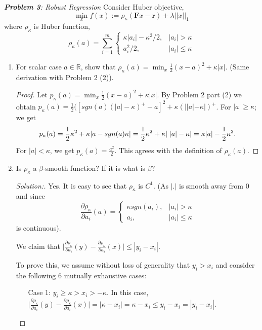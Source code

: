 \documentclass[a4paper,11pt,reqno]{amsart}
\theoremstyle{plain}
\theoremstyle{definition}
\theoremstyle{remark}
\numberwithin{equation}{section}
\begin{document}
\vskip 16pt \noindent
{\it \textbf{Problem 3}: Robust Regression}
\vskip 8pt
Consider Huber objective,
\[
\min_x f(x):=\rho_\kappa(\mathbf{F}x - \mathbf{r}) + \lambda||x||_1
\]
where $\rho_\kappa$ is Huber function,
\[
\rho_\kappa(a) = \sum_{i=1}^m\begin{cases}
\kappa|a_i| - \kappa^2/2,&|a_i| > \kappa\\
a_i^2/2,&|a_i| \le \kappa
\end{cases}
\]
\begin{enumerate}
\item For scalar case $a\in\mathbb{R}$, show that $\rho_\kappa(a) = \min_x \frac{1}{2}(x-a)^2+\kappa|x|$. (Same derivation with Problem 2 (2)).
\begin{proof}
	Let $p_\kappa(a) = \min_x \frac{1}{2}(x-a)^2+\kappa|x|$. By Problem 2 part (2) we obtain 
	$p_{\kappa}(a) = \frac{1}{2}([sgn(a)(|a| - \kappa)^{+} - a] ^2 + \kappa (| |a| - \kappa|)^{+}$. 
	For $|a| \geq \kappa$; we get 
	\[ p_{\kappa}(a) = \frac{1}{2}\kappa^2 + \kappa |a - sgn(a) \kappa| \\
	 =  \frac{1}{2}\kappa^2 + \kappa |\;|a| -\kappa| = \kappa |a| - \frac{1}{2} \kappa^2.
	 \]
	 For $|a| < \kappa$, we get $p_{\kappa}(a) = \frac{a^2}{2}$. This agrees with the definition of $\rho_{\kappa}(a)$. 
	\end{proof}
\vskip 16pt
\item Is $\rho_\kappa$ a $\beta$-smooth function? If it is what is $\beta$?
\begin{proof}[Solution:] Yes. It is easy to see that $\rho_{\kappa}$ is $C^1$. (As $|.|$  is smooth away from $0$ and since  
		\[
		\frac{\partial \rho_{\kappa}}{\partial a_i}(a) = \begin{cases}
		\kappa sgn(a_i) ,&|a_i| > \kappa\\
		a_i,&|a_i| \le \kappa
		\end{cases}
		\]
		is continuous).
		
		We claim that $\big |\frac{\partial \rho_{\kappa}}{\partial a_i}(y) - \frac{\partial \rho_{\kappa}}{\partial a_i}(x) \big | \leq |y_i - x_i|$. 
		
		To prove this, we assume without loss of generality that $y_i > x_i$ and consider the following 6 mutually exhaustive cases: 
		
		\begin{enumerate}
			\item [Case 1:] $y_i \geq \kappa > x_i > - \kappa$. 
			In this case, $\big |\frac{\partial \rho_{\kappa}}{\partial a_i}(y) - \frac{\partial \rho_{\kappa}}{\partial a_i}(x)\big | = |\kappa - x_i | = \kappa - x_i \leq y_i - x_i  = |y_i - x_i|$.
			

\end{enumerate}
\end{proof}
\end{enumerate}
\end{document}
